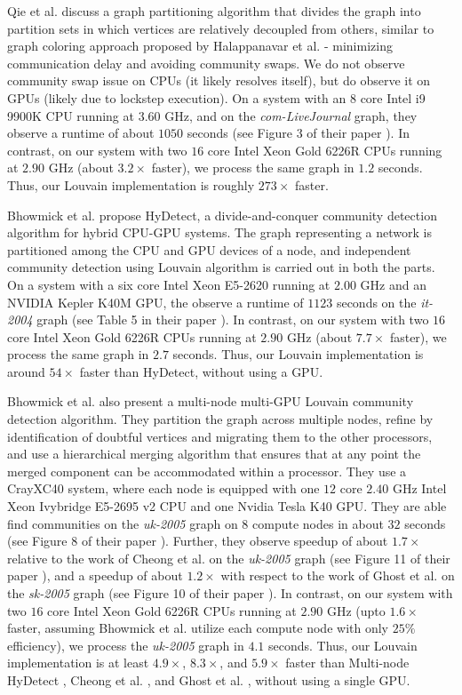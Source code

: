 Qie et al. \cite{qie2022isolate} discuss a graph partitioning algorithm that divides the graph into partition sets in which vertices are relatively decoupled from others, similar to graph coloring approach proposed by Halappanavar et al. \cite{com-halappanavar17} - minimizing communication delay and avoiding community swaps. We do not observe community swap issue on CPUs (it likely resolves itself), but do observe it on GPUs (likely due to lockstep execution). On a system with an $8$ core Intel i9 9900K CPU running at $3.60$ GHz, and on the \textit{com-LiveJournal} graph, they observe a runtime of about $1050$ seconds (see Figure 3 of their paper \cite{qie2022isolate}). In contrast, on our system with two $16$ core Intel Xeon Gold 6226R CPUs running at $2.90$ GHz (about $3.2\times$ faster), we process the same graph in $1.2$ seconds. Thus, our Louvain implementation is roughly $273\times$ faster.

Bhowmick et al. \cite{com-bhowmik19} propose HyDetect, a divide-and-conquer community detection algorithm for hybrid CPU-GPU systems. The graph representing a network is partitioned among the CPU and GPU devices of a node, and independent community detection using Louvain algorithm is carried out in both the parts. On a system with a six core Intel Xeon E5-2620 running at $2.00$ GHz and an NVIDIA Kepler K40M GPU, the observe a runtime of $1123$ seconds on the \textit{it-2004} graph (see Table 5 in their paper \cite{com-bhowmik19}). In contrast, on our system with two $16$ core Intel Xeon Gold 6226R CPUs running at $2.90$ GHz (about $7.7\times$ faster), we process the same graph in $2.7$ seconds. Thus, our Louvain implementation is around $54\times$ faster than HyDetect, without using a GPU.

Bhowmick et al. \cite{com-bhowmick22} also present a multi-node multi-GPU Louvain community detection algorithm. They partition the graph across multiple nodes, refine by identification of doubtful vertices and migrating them to the other processors, and use a hierarchical merging algorithm that ensures that at any point the merged component can be accommodated within a processor. They use a CrayXC40 system, where each node is equipped with one $12$ core $2.40$ GHz Intel Xeon Ivybridge E5-2695 v2 CPU and one Nvidia Tesla K40 GPU. They are able find communities on the \textit{uk-2005} graph on $8$ compute nodes in about $32$ seconds (see Figure 8 of their paper \cite{com-bhowmick22}). Further, they observe speedup of about $1.7\times$ relative to the work of Cheong et al. \cite{com-cheong13} on the \textit{uk-2005} graph (see Figure 11 of their paper \cite{com-bhowmick22}), and a speedup of about $1.2\times$ with respect to the work of Ghost et al. \cite{com-ghosh18} on the \textit{sk-2005} graph (see Figure 10 of their paper \cite{com-bhowmick22}). In contrast, on our system with two $16$ core Intel Xeon Gold 6226R CPUs running at $2.90$ GHz (upto $1.6\times$ faster, assuming Bhowmick et al. utilize each compute node with only $25\%$ efficiency), we process the \textit{uk-2005} graph in $4.1$ seconds. Thus, our Louvain implementation is at least $4.9\times$, $8.3\times$, and $5.9\times$ faster than Multi-node HyDetect \cite{com-bhowmick22}, Cheong et al. \cite{com-cheong13}, and Ghost et al. \cite{com-ghosh18}, without using a single GPU.

